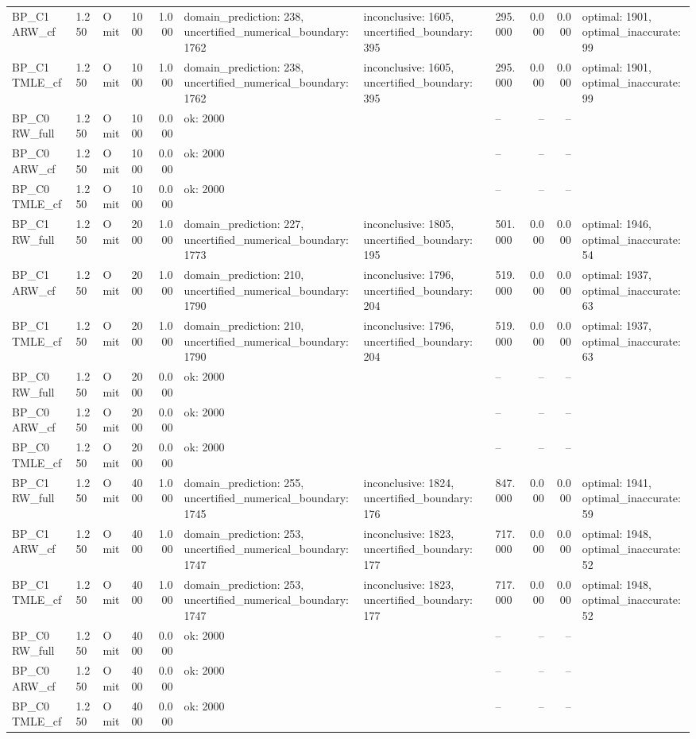 \begin{tabular}{llllrlllrrl}
BP\_C1 ARW\_cf & 1.250 & Omit & 1000 & 1.000 & domain\_prediction: 238, uncertified\_numerical\_boundary: 1762 & inconclusive: 1605, uncertified\_boundary: 395 & 295.000 & 0.000 & 0.000 & optimal: 1901, optimal\_inaccurate: 99 \\
BP\_C1 TMLE\_cf & 1.250 & Omit & 1000 & 1.000 & domain\_prediction: 238, uncertified\_numerical\_boundary: 1762 & inconclusive: 1605, uncertified\_boundary: 395 & 295.000 & 0.000 & 0.000 & optimal: 1901, optimal\_inaccurate: 99 \\
BP\_C0 RW\_full & 1.250 & Omit & 1000 & 0.000 & ok: 2000 &  & -- & -- & -- &  \\
BP\_C0 ARW\_cf & 1.250 & Omit & 1000 & 0.000 & ok: 2000 &  & -- & -- & -- &  \\
BP\_C0 TMLE\_cf & 1.250 & Omit & 1000 & 0.000 & ok: 2000 &  & -- & -- & -- &  \\
BP\_C1 RW\_full & 1.250 & Omit & 2000 & 1.000 & domain\_prediction: 227, uncertified\_numerical\_boundary: 1773 & inconclusive: 1805, uncertified\_boundary: 195 & 501.000 & 0.000 & 0.000 & optimal: 1946, optimal\_inaccurate: 54 \\
BP\_C1 ARW\_cf & 1.250 & Omit & 2000 & 1.000 & domain\_prediction: 210, uncertified\_numerical\_boundary: 1790 & inconclusive: 1796, uncertified\_boundary: 204 & 519.000 & 0.000 & 0.000 & optimal: 1937, optimal\_inaccurate: 63 \\
BP\_C1 TMLE\_cf & 1.250 & Omit & 2000 & 1.000 & domain\_prediction: 210, uncertified\_numerical\_boundary: 1790 & inconclusive: 1796, uncertified\_boundary: 204 & 519.000 & 0.000 & 0.000 & optimal: 1937, optimal\_inaccurate: 63 \\
BP\_C0 RW\_full & 1.250 & Omit & 2000 & 0.000 & ok: 2000 &  & -- & -- & -- &  \\
BP\_C0 ARW\_cf & 1.250 & Omit & 2000 & 0.000 & ok: 2000 &  & -- & -- & -- &  \\
BP\_C0 TMLE\_cf & 1.250 & Omit & 2000 & 0.000 & ok: 2000 &  & -- & -- & -- &  \\
BP\_C1 RW\_full & 1.250 & Omit & 4000 & 1.000 & domain\_prediction: 255, uncertified\_numerical\_boundary: 1745 & inconclusive: 1824, uncertified\_boundary: 176 & 847.000 & 0.000 & 0.000 & optimal: 1941, optimal\_inaccurate: 59 \\
BP\_C1 ARW\_cf & 1.250 & Omit & 4000 & 1.000 & domain\_prediction: 253, uncertified\_numerical\_boundary: 1747 & inconclusive: 1823, uncertified\_boundary: 177 & 717.000 & 0.000 & 0.000 & optimal: 1948, optimal\_inaccurate: 52 \\
BP\_C1 TMLE\_cf & 1.250 & Omit & 4000 & 1.000 & domain\_prediction: 253, uncertified\_numerical\_boundary: 1747 & inconclusive: 1823, uncertified\_boundary: 177 & 717.000 & 0.000 & 0.000 & optimal: 1948, optimal\_inaccurate: 52 \\
BP\_C0 RW\_full & 1.250 & Omit & 4000 & 0.000 & ok: 2000 &  & -- & -- & -- &  \\
BP\_C0 ARW\_cf & 1.250 & Omit & 4000 & 0.000 & ok: 2000 &  & -- & -- & -- &  \\
BP\_C0 TMLE\_cf & 1.250 & Omit & 4000 & 0.000 & ok: 2000 &  & -- & -- & -- &  \\
\hline
\end{tabular}
